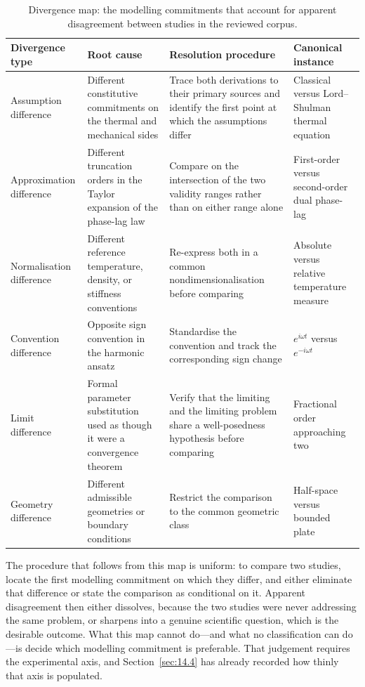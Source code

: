 \begin{table}[htbp]
\centering
\small
\caption{Divergence map: the modelling commitments that account for apparent disagreement between studies in the reviewed corpus.}
\label{tab:contradiction_map}
\begin{tabularx}{\textwidth}{@{}p{2.4cm}X X p{2.8cm}@{}}
\toprule
\textbf{Divergence type} & \textbf{Root cause} & \textbf{Resolution procedure} & \textbf{Canonical instance} \\
\midrule
Assumption difference & Different constitutive commitments on the thermal and mechanical sides & Trace both derivations to their primary sources and identify the first point at which the assumptions differ & Classical versus Lord--Shulman thermal equation \\
Approximation difference & Different truncation orders in the Taylor expansion of the phase-lag law & Compare on the intersection of the two validity ranges rather than on either range alone & First-order versus second-order dual phase-lag \\
Normalisation difference & Different reference temperature, density, or stiffness conventions & Re-express both in a common nondimensionalisation before comparing & Absolute versus relative temperature measure \\
Convention difference & Opposite sign convention in the harmonic ansatz & Standardise the convention and track the corresponding sign change & $e^{i\omega t}$ versus $e^{-i\omega t}$ \\
Limit difference & Formal parameter substitution used as though it were a convergence theorem & Verify that the limiting and the limiting problem share a well-posedness hypothesis before comparing & Fractional order approaching two \\
Geometry difference & Different admissible geometries or boundary conditions & Restrict the comparison to the common geometric class & Half-space versus bounded plate \\
\bottomrule
\end{tabularx}
\end{table}

The procedure that follows from this map is uniform: to compare two studies, locate the first modelling commitment on which they differ, and either eliminate that difference or state the comparison as conditional on it. Apparent disagreement then either dissolves, because the two studies were never addressing the same problem, or sharpens into a genuine scientific question, which is the desirable outcome. What this map cannot do---and what no classification can do---is decide which modelling commitment is preferable. That judgement requires the experimental axis, and Section~\ref{sec:14.4} has already recorded how thinly that axis is populated.

